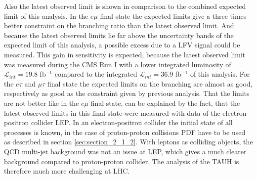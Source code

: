 Also the latest observed limit is shown in comparison to the combined expected limit of this analysis. In the $e\mu$ final state the expected limits give a three times better constraint on the branching ratio than the latest observed limit. And because the latest observed limits lie far above the uncertainty bands of the expected limit of this analysis, a possible excess due to a \gls{LFV} signal could be measured. This gain in sensitivity is expected, because the latest observed limit was measured during the \gls{CMS} Run I with a lower integrated luminosity of $\mathcal{L}_{int} = 19.8$ fb$^{-1}$ compared to the integrated $\mathcal{L}_{int} = 36.9$ fb$^{-1}$ of this analysis. For the $e\tau$ and $\mu\tau$ final state the expected limits on the branching are almost as good, respectively as good as the constraint given by previous analysis. That the limits are not better like in the $e\mu$ final state, can be explained by the fact, that the latest observed limits in this final state were measured with data of the electron-positron collider \gls{LEP}. In an electron-positron collider the initial state of all processes is known, in the case of proton-proton collisions \gls{PDF} have to be used as described in section \ref{sec:section_2_1_2}. With leptons as colliding objects, the \gls{QCD} multi-jet background was not an issue at \gls{LEP}, which gives a much clearer background compared to proton-proton collider. The analysis of the \gls{TAUH} is therefore much more challenging at \gls{LHC}. 

